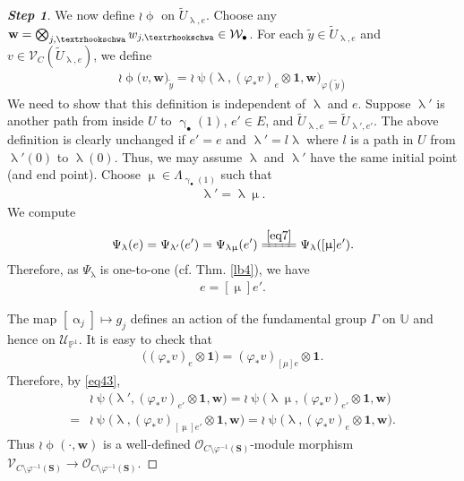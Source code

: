 \documentclass[11pt,b5paper,notitlepage]{article}
\theoremstyle{definition}
\theoremstyle{plain}
\newcommand{\mc}{\mathcal}
\newcommand{\wtd}{\widetilde}
\newcommand{\id}{\mathbf{1}}
\newcommand{\scr}{\mathscr}
\newcommand{\blt}{\bullet}
\newcommand{\Ubb}{\mathbb U}
\newcommand{\Pbb}{\mathbb P}
\newcommand{\Sbf}{\mathbf{S}}
\newcommand{\wbf}{\mathbf w}
\newcommand{\tipae}{\text{\textrhookschwa}}
\numberwithin{equation}{subsection}
\begin{document}
\begin{proof}[\textbf{Step 1}]
We now define $\wr\upphi$ on $\wtd U_{\uplambda,e}$. Choose any $\wbf=\bigotimes_{j,\tipae}w_{j,\tipae}\in \mc W_\blt$. For each $\wtd y\in\wtd U_{\uplambda,e}$ and $v\in\scr V_C(\wtd U_{\uplambda,e})$, we define
\begin{align}
\boxed{~\wr\upphi\big(v,\wbf\big)_{\wtd y}=\wr\uppsi\big(\uplambda,(\varphi_*v)_e\otimes\id,\wbf\big)_{\varphi(\wtd y)}~}\label{eq50}	
\end{align}
We need to show that this definition is independent of $\uplambda$ and $e$. Suppose $\uplambda'$ is another path from inside $U$ to $\upgamma_\blt(1)$, $e'\in E$, and $\wtd U_{\uplambda,e}=\wtd U_{\uplambda',e'}$. The above definition is clearly unchanged if $e'=e$ and $\uplambda'=l\uplambda$ where $l$ is a path in $U$ from $\uplambda'(0)$ to $\uplambda(0)$. Thus, we may assume $\uplambda$ and $\uplambda'$ have the same initial point (and end point). Choose $\upmu\in\Lambda_{\upgamma_\blt(1)}$ such that
\begin{align*}
\uplambda'=\uplambda\upmu.	
\end{align*}
We compute
\begin{align*}
\Psi_{\uplambda}(e)=\Psi_{\uplambda'}(e')=\Psi_{\uplambda\upmu}(e')\xlongequal{\eqref{eq7}}\Psi_{\uplambda}([\upmu]e').	
\end{align*}
Therefore, as $\Psi_{\uplambda}$ is one-to-one (cf. Thm. \ref{lb4}), we have
\begin{align*}
e=[\upmu]e'.	
\end{align*}

The map $[\upalpha_j]\mapsto g_j$ defines an action of the fundamental group $\Gamma$ on $\Ubb$ and hence on $\scr U_{\Pbb^1}$. It is easy to check that
\begin{align*}
[\upmu]	\big((\varphi_*v)_e\otimes\id\big)=(\varphi_*v)_{[\mu]e}\otimes\id.
\end{align*}
Therefore, by \eqref{eq43},
\begin{align*}
&\wr\uppsi\big(\uplambda',(\varphi_*v)_{e'}\otimes\id,\wbf\big)=\wr\uppsi\big(\uplambda\upmu,(\varphi_*v)_{e'}\otimes\id,\wbf\big)\\
=&	\wr\uppsi\big(\uplambda,(\varphi_*v)_{[\upmu]e'}\otimes\id,\wbf\big)=\wr\uppsi\big(\uplambda,(\varphi_*v)_e\otimes\id,\wbf\big).
\end{align*}
Thus $\wr\upphi(\cdot,\wbf)$ is a well-defined $\scr O_{C\setminus\varphi^{-1}(\Sbf)}$-module morphism $\scr V_{C\setminus\varphi^{-1}(\Sbf)}\rightarrow \scr O_{C\setminus\varphi^{-1}(\Sbf)}$.
\end{proof}
\end{document}
